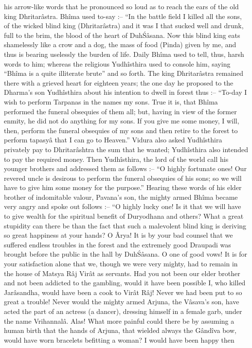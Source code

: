 his arrow-like words that he pronounced so loud as to reach the ears of the old king Dhritar\^astra. Bh\^ima used to-say :-- ``In the battle field I killed all the sons, of the wicked blind king (Dhritar\^astra) and it was I that sucked well and drunk, full to the brim, the blood of the heart of Duh\'S\^asana. Now this blind king eats shamelessly like a crow and a dog, the mass of food (Pinda) given by me, and thus is bearing uselessly the burden of life. Daily Bh\^ima used to tell, thus, harsh words to him; whereas the religious Yudh\^isthira used to console him, saying ``Bh\^ima is a quite illiterate brute'' and so forth. The king Dhritar\^astra remained there with a grieved heart for eighteen years; the one day he proposed to the Dharma's son Yudh\^isthira about his intention to dwell in forest thus :-- ``To-day I wish to perform Tarpanas in the names my sons. True it is, that Bh\^ima performed the funeral obsequies of them all; but, having in view of the former enmity, he did not do anything for my sons. If you give me some money, I will, then, perform the funeral obsequies of my sons and then retire to the forest to perform tapasy\^a that I can go to Heaven.'' Vidura also asked Yudh\^isthira privately pay to Dhritar\^ashtra the sum that he wanted; Yudh\^isthira also intended to pay the required money. Then Yudh\^isthira, the lord of the world call his younger brothers and addressed them as follows :-- ``O highly fortunate ones! Our revered uncle is desirous to perform the funeral obsequies of his sons; so we will have to give him some money for the purpose.'' Hearing these words of his elder brother of indomitable valour, Pavana's son, the mighty armed Bh\^ima became very angry and spoke out follows :-- ``O highly lucky one! Is it that we will have to give wealth for the spiritual benefit of Duryodhana and others? What a great stupidity can there be than the fact that such a malevolent blind king is deriving so great happiness at your hands? O Ârya! It is by your bad counsel that we suffered endless troubles in the forest and the extremely good Draupadi was brought before the public in the hall by Duh\'S\^asana. O one of good vows! It is for your satisfaction alone that we, though we were very mighty, had to remain in the house of Matsya R\^aj Vir\^at as servants. Had you not been our elder brother and not been addicted to the gambling, would it have been possible I, who killed Jar\^asandha, would have been a cook to Vir\^at R\^aj! Never we had been put to so great a trouble! Never would the mighty armed Arjuna, the V\^asava's son, have acted the part of an actress (a dancer), dressing himself in a female garb, under the name Vrihannal\^a. Alas! What more painful could there be by assuming a human birth that the hands of Arjuna, that wielded always the G\^and\^iva bow, would have worn bracelets befitting a woman? I would have been happy then

